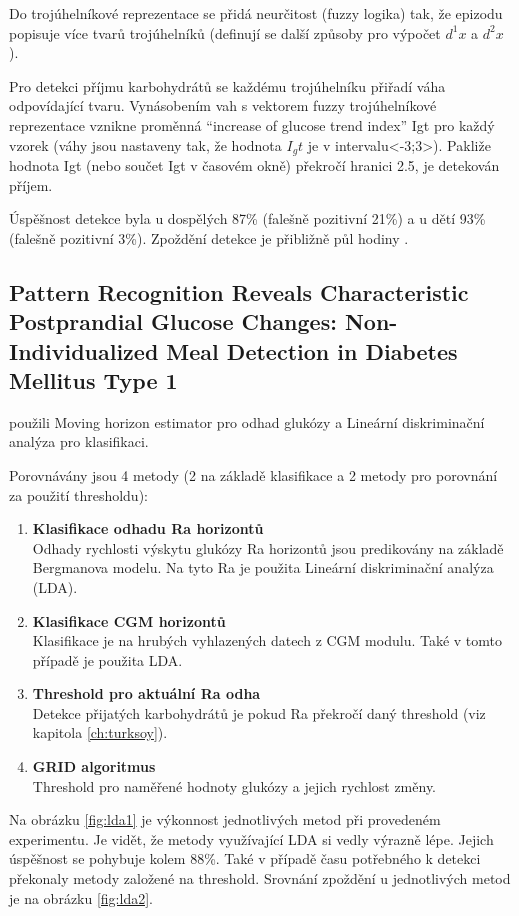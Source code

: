 Do trojúhelníkové reprezentace se přidá neurčitost (fuzzy logika) tak, že epizodu popisuje více tvarů trojúhelníků (definují se další způsoby pro výpočet $d^1x$ a $d^2x$).

Pro detekci příjmu karbohydrátů se každému trojúhelníku přiřadí váha odpovídající tvaru. Vynásobením vah s vektorem fuzzy trojúhelníkové reprezentace vznikne proměnná “increase of glucose trend index” Igt pro každý vzorek (váhy jsou nastaveny tak, že hodnota $I_gt$ je v intervalu<-3;3>). Pakliže hodnota Igt (nebo součet Igt v časovém okně) překročí hranici 2.5, je detekován příjem.

Úspěšnost detekce byla u dospělých 87\% (falešně pozitivní 21\%) a u dětí 93\% (falešně pozitivní 3\%). Zpoždění detekce je přibližně půl hodiny \citep{Analyza.WaveletEst}.


\subsection{Pattern Recognition Reveals Characteristic Postprandial Glucose Changes: Non-Individualized Meal Detection in Diabetes Mellitus Type 1}
\label{ch:lda}

\citet{Analyza.LDA} použili Moving horizon estimator pro odhad glukózy a Lineární diskriminační analýza pro klasifikaci.

Porovnávány jsou 4 metody (2 na základě klasifikace a 2 metody pro porovnání za použití thresholdu):

\begin{enumerate}
\item \textbf{Klasifikace odhadu Ra horizontů} \\
Odhady rychlosti výskytu glukózy Ra horizontů jsou predikovány na základě Bergmanova modelu. Na tyto Ra je použita Lineární diskriminační analýza (LDA).
\item \textbf{Klasifikace CGM horizontů} \\
Klasifikace je na hrubých vyhlazených datech z CGM modulu. Také v tomto případě je použita LDA.
\item \textbf{Threshold pro aktuální Ra odha} \\
Detekce přijatých karbohydrátů je pokud Ra překročí daný threshold (viz kapitola \ref{ch:turksoy}).
\item \textbf{GRID algoritmus} \\
Threshold pro naměřené hodnoty glukózy a jejich rychlost změny.
\end{enumerate}

Na obrázku \ref{fig:lda1} je výkonnost jednotlivých metod při provedeném experimentu. Je vidět, že metody využívající LDA si vedly výrazně lépe. Jejich úspěšnost se pohybuje kolem 88\%. Také v případě času potřebného k detekci překonaly metody založené na threshold. Srovnání zpoždění u jednotlivých metod je na obrázku \ref{fig:lda2}.

